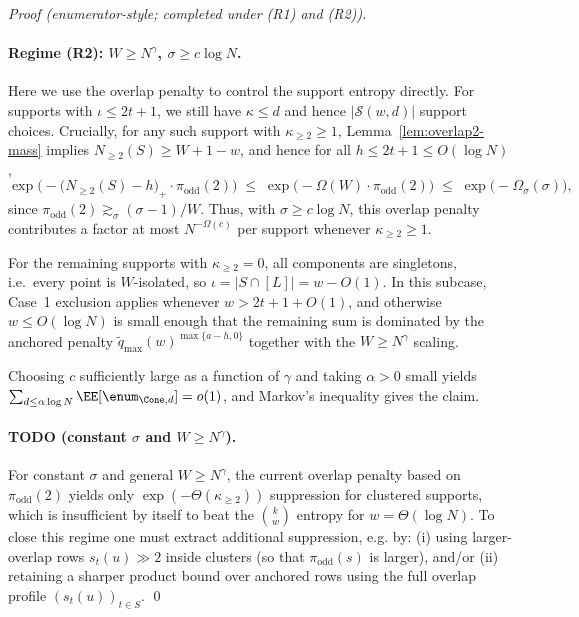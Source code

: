 \begin{proof}[Proof (enumerator-style; completed under (R1) and (R2))]
\paragraph{Regime (R2): $W\ge N^\gamma$, $\sigma\ge c\log N$.}
Here we use the overlap penalty to control the support entropy directly.
For supports with $\iota\le 2t+1$, we still have $\kappa\le d$ and hence $|\mathcal S(w,d)|$ support choices.
Crucially, for any such support with $\kappa_{\ge 2}\ge 1$, Lemma~\ref{lem:overlap2-mass} implies
$N_{\ge 2}(S)\ge W+1-w$, and hence for all $h\le 2t+1\le O(\log N)$,
\[
\exp\!\big(-\big(N_{\ge 2}(S)-h\big)_+\cdot \pi_{\mathrm{odd}}(2)\big)
\;\le\;
\exp\!\big(-\Omega(W)\cdot \pi_{\mathrm{odd}}(2)\big)
\;\le\;
\exp\!\big(-\Omega_\sigma(\sigma)\big),
\]
since $\pi_{\mathrm{odd}}(2)\gtrsim_\sigma (\sigma-1)/W$.
Thus, with $\sigma\ge c\log N$, this overlap penalty contributes a factor at most $N^{-\Omega(c)}$ per support whenever
$\kappa_{\ge 2}\ge 1$.

For the remaining supports with $\kappa_{\ge 2}=0$, all components are singletons, i.e.\ every point is $W$-isolated,
so $\iota=|S\cap[L]|=w-O(1)$. In this subcase, Case~1 exclusion applies whenever $w>2t+1+O(1)$, and otherwise $w\le O(\log N)$
is small enough that the remaining sum is dominated by the anchored penalty
$\widetilde q_{\max}(w)^{\max\{a-h,0\}}$ together with the $W\ge N^\gamma$ scaling.

Choosing $c$ sufficiently large as a function of $\gamma$ and taking $\alpha>0$ small yields
$\sum_{d\le \alpha\log N}\EE[\enum_{\Cone,d}]=o(1)$, and Markov's inequality gives the claim.

\paragraph{TODO (constant $\sigma$ and $W\ge N^\gamma$).}
For constant $\sigma$ and general $W\ge N^\gamma$, the current overlap penalty based on $\pi_{\mathrm{odd}}(2)$ yields only
$\exp(-\Theta(\kappa_{\ge 2}))$ suppression for clustered supports, which is insufficient by itself to beat the
$\binom{k}{w}$ entropy for $w=\Theta(\log N)$.
To close this regime one must extract additional suppression, e.g. by:
(i) using larger-overlap rows $s_t(u)\gg 2$ inside clusters (so that $\pi_{\mathrm{odd}}(s)$ is larger), and/or
(ii) retaining a sharper product bound over anchored rows using the full overlap profile $(s_t(u))_{t\in S}$.
\qed
\end{proof}




